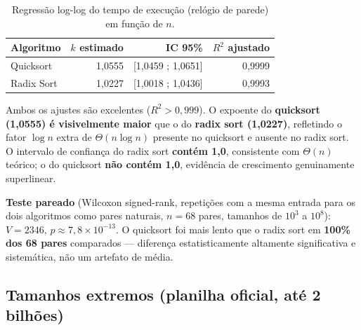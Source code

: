 \documentclass[11pt,a4paper]{article}
\renewcommand{\_}{\underscoreoriginal\allowbreak}
\begin{document}
\begin{table}[H]
\centering
\caption{Regressão log-log do tempo de execução (relógio de parede) em função de $n$.}
\begin{tabular}{l r r r}
\toprule
\rowcolor{tablehead}
Algoritmo & $k$ estimado & IC 95\% & $R^2$ ajustado\\
\midrule
Quicksort   & 1,0555 & [1,0459 ; 1,0651] & 0,9999\\
Radix Sort  & 1,0227 & [1,0018 ; 1,0436] & 0,9993\\
\bottomrule
\end{tabular}
\end{table}

Ambos os ajustes são excelentes ($R^2 > 0{,}999$). O expoente do
\textbf{quicksort (1,0555) é visivelmente maior} que o do \textbf{radix
sort (1,0227)}, refletindo o fator $\log n$ extra de
$\Theta(n\log n)$ presente no quicksort e ausente no radix sort. O
intervalo de confiança do radix sort \textbf{contém 1,0}, consistente
com $\Theta(n)$ teórico; o do quicksort \textbf{não contém 1,0},
evidência de crescimento genuinamente superlinear.

\textbf{Teste pareado} (Wilcoxon signed-rank, repetições com a mesma
entrada para os dois algoritmos como pares naturais, $n=68$ pares,
tamanhos de $10^3$ a $10^8$): $V=2346$, $p\approx7{,}8\times10^{-13}$. O
quicksort foi mais lento que o radix sort em \textbf{100\% dos 68 pares}
comparados --- diferença estatisticamente altamente significativa e
sistemática, não um artefato de média.

\subsection{Tamanhos extremos (planilha oficial, até 2 bilhões)}
\label{sec:planilha-oficial}
\label{sec:t2e9}
\end{document}
